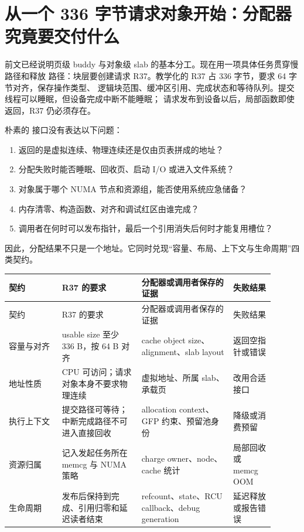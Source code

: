 \section{从一个 336 字节请求对象开始：分配器究竟要交付什么}

前文已经说明页级 buddy 与对象级 slab 的基本分工。现在用一项具体任务贯穿慢路径和释放
路径：块层要创建请求 R37。教学化的 R37 占 336 字节，要求 64 字节对齐，保存操作类型、
逻辑块范围、缓冲区引用、完成状态和等待队列。提交线程可以睡眠，但设备完成中断不能睡眠；
请求发布到设备以后，局部函数即使返回，R37 仍必须存在。

朴素的  接口没有表达以下问题：

\begin{enumerate}
\tightlist
\item 返回的是虚拟连续、物理连续还是仅由页表拼成的地址？
\item 分配失败时能否睡眠、回收页、启动 I/O 或进入文件系统？
\item 对象属于哪个 NUMA 节点和资源组，能否使用系统应急储备？
\item 内存清零、构造函数、对齐和调试红区由谁完成？
\item 调用者在何时可以发布指针，最后一个引用消失后何时才能复用槽位？
\end{enumerate}

因此，分配结果不只是一个地址。它同时兑现“容量、布局、上下文与生命周期”四类契约。

\begin{longtable}{|L{0.18\linewidth}|L{0.27\linewidth}|L{0.31\linewidth}|L{0.14\linewidth}|}
\hline
契约 & R37 的要求 & 分配器或调用者保存的证据 & 失败结果 \\ \hline
\endfirsthead
\hline
契约 & R37 的要求 & 分配器或调用者保存的证据 & 失败结果 \\ \hline
\endhead
容量与对齐 & usable size 至少 336 B，按 64 B 对齐 &
cache object size、alignment、slab layout & 返回空指针或错误 \\\tablerowrule
地址性质 & CPU 可访问；请求对象本身不要求物理连续 &
虚拟地址、所属 slab、承载页 & 改用合适接口 \\\tablerowrule
执行上下文 & 提交路径可等待；中断完成路径不可进入直接回收 &
allocation context、GFP 约束、预留池身份 & 降级或消费预留 \\\tablerowrule
资源归属 & 记入发起任务所在 memcg 与 NUMA 策略 &
charge owner、node、cache 统计 & 局部回收或 memcg OOM \\\tablerowrule
生命周期 & 发布后保持到完成、引用归零和延迟读者结束 &
refcount、state、RCU callback、debug generation & 延迟释放或报告错误 \\
\hline
\end{longtable}

